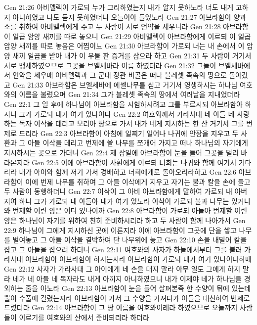 Gen 21:26  아비멜렉이 가로되 누가 그리하였는지 내가 알지 못하노라 너도 내게 고하지 아니하였고 나도 듣지 못하였더니 오늘이야 들었노라
Gen 21:27  아브라함이 양과 소를 취하여 아비멜렉에게 주고 두 사람이 서로 언약을 세우니라
Gen 21:28  아브라함이 일곱 암양 새끼를 따로 놓으니
Gen 21:29  아비멜렉이 아브라함에게 이르되 이 일곱 암양 새끼를 따로 놓음은 어찜이뇨
Gen 21:30  아브라함이 가로되 너는 내 손에서 이 암양 새끼 일곱을 받아 내가 이 우물 판 증거를 삼으라 하고
Gen 21:31  두 사람이 거기서 서로 맹세하였으므로 그곳을 브엘세바라 이름 하였더라
Gen 21:32  그들이 브엘세바에서 언약을 세우매 아비멜렉과 그 군대 장관 비골은 떠나 블레셋 족속의 땅으로 돌아갔고
Gen 21:33  아브라함은 브엘세바에 에셀나무를 심고 거기서 영생하시는 하나님 여호와의 이름을 불렀으며
Gen 21:34  그가 블레셋 족속의 땅에서 여러날을 지내었더라
Gen 22:1  그 일 후에 하나님이 아브라함을 시험하시려고 그를 부르시되 아브라함아 하시니 그가 가로되 내가 여기 있나이다
Gen 22:2  여호와께서 가라사대 네 아들 네 사랑하는 독자 이삭을 데리고 모리아 땅으로 가서 내가 네게 지시하는 한 산 거기서 그를 번제로 드리라
Gen 22:3  아브라함이 아침에 일찌기 일어나 나귀에 안장을 지우고 두 사환과 그 아들 이삭을 데리고 번제에 쓸 나무를 쪼개어 가지고 떠나 하나님의 자기에게 지시하시는 곳으로 가더니
Gen 22:4  제 삼일에 아브라함이 눈을 들어 그곳을 멀리 바라본지라
Gen 22:5  이에 아브라함이 사환에게 이르되 너희는 나귀와 함께 여기서 기다리라 내가 아이와 함께 저기 가서 경배하고 너희에게로 돌아오리라하고
Gen 22:6  아브라함이 이에 번제 나무를 취하여 그 아들 이삭에게 지우고 자기는 불과 칼을 손에 들고 두 사람이 동행하더니
Gen 22:7  이삭이 그 아비 아브라함에게 말하여 가로되 내 아버지여 하니 그가 가로되 내 아들아 내가 여기 있노라 이삭이 가로되 불과 나무는 있거니와 번제할 어린 양은 어디 있나이까
Gen 22:8  아브라함이 가로되 아들아 번제할 어린 양은 하나님이 자기를 위하여 친히 준비하시리라 하고 두 사람이 함께 나아가서
Gen 22:9  하나님이 그에게 지시하신 곳에 이른지라 이에 아브라함이 그곳에 단을 쌓고 나무를 벌여놓고 그 아들 이삭을 결박하여 단 나무위에 놓고
Gen 22:10  손을 내밀어 칼을 잡고 그 아들을 잡으려 하더니
Gen 22:11  여호와의 사자가 하늘에서부터 그를 불러 가라사대 아브라함아 아브라함아 하시는지라 아브라함이 가로되 내가 여기 있나이다하매
Gen 22:12  사자가 가라사대 그 아이에게 네 손을 대지 말라 아무 일도 그에게 하지 말라 네가 네 아들 네 독자라도 내게 아끼지 아니하였으니 내가 이제야 네가 하나님을 경외하는 줄을 아노라
Gen 22:13  아브라함이 눈을 들어 살펴본즉 한 수양이 뒤에 있는데 뿔이 수풀에 걸렸는지라 아브라함이 가서 그 수양을 가져다가 아들을 대신하여 번제로 드렸더라
Gen 22:14  아브라함이 그 땅 이름을 여호와이레라 하였으므로 오늘까지 사람들이 이르기를 여호와의 산에서 준비되리라 하더라
